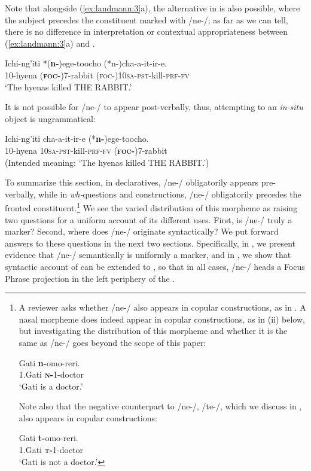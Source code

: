 \documentclass[output=paper,modfonts]{langscibook}
\begin{document}
Note that alongside (\ref{ex:landmann:3}a), the alternative  in  is also possible, where the subject precedes the constituent marked with /ne-/; as far as we can tell, there is no difference in interpretation or contextual appropriateness between (\ref{ex:landmann:3}a) and .

\ea\label{ex:landmann:4}
  \gll Ichi-ng’iti *(\textbf{n-})ege-toocho (*n-)cha-a-it-ir-e.\\
     10-hyena (\textsc{\textbf{foc}}\textbf{-})7-rabbit (\textsc{foc}-)\textsc{10sa}-\textsc{pst}-kill-\textsc{prf}-\textsc{fv}\\
\glt ‘The hyenas killed THE RABBIT.’
\z

It is not possible for /ne-/ to appear post-verbally, thus, attempting to  an \textit{in-situ} object is ungrammatical:

\ea
  \gll Ichi-ng’iti cha-a-it-ir-e (*\textbf{n-})ege-toocho.\\
     10-hyena \textsc{10sa}-\textsc{pst}-kill-\textsc{prf}-\textsc{fv} (\textsc{\textbf{foc}}\textbf{-})7-rabbit\\
\glt (Intended meaning: ‘The hyenas killed THE RABBIT.’)
\z

To summarize this section, in declaratives, /ne-/ obligatorily appears pre-verbally, while in \textit{wh-}questions and  constructions, /ne-/ obligatorily precedes the fronted constituent.\footnote{{A reviewer asks whether /ne-/ also appears in copular constructions, as in  \citep{Schwarz2007}. A nasal morpheme does indeed appear in copular constructions, as in (ii) below, but investigating the distribution of this morpheme and whether it is the same as /ne-/ goes beyond the scope of this paper:}

\ea
\gll Gati \textbf{n-}omo-reri.\\
1.Gati \textsc{\textbf{n}}\textbf{-}1-doctor\\
\glt ‘Gati is a doctor.’
\z

Note also that the negative counterpart to /ne-/, /te-/, which we discuss in , also appears in copular constructions:

\ea
\gll Gati \textbf{t-}omo-reri.\\
1.Gati \textsc{\textbf{t-}}1-doctor\\
\glt ‘Gati is not a doctor.’
\z
} 
We see the varied distribution of this morpheme as raising two questions for a uniform account of its different uses. First, is /ne-/ truly a  marker? Second, where does /ne-/ originate syntactically? We put forward answers to these questions in the next two sections. Specifically, in , we present evidence that /ne-/ semantically is uniformly a  marker, and in , we show that  syntactic account of  can be extended to , so that in all cases, /ne-/ heads a Focus Phrase projection in the left periphery of the .
\end{document}
